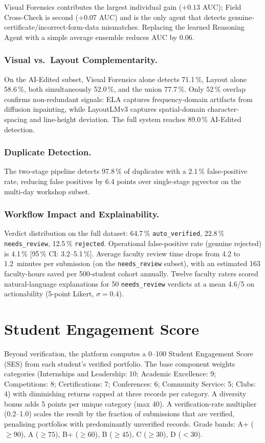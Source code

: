 \documentclass[runningheads]{llncs}
\begin{document}
Visual Forensics contributes the largest individual gain ($+0.13$ AUC); Field Cross-Check is second ($+0.07$ AUC) and is the only agent that detects genuine-certificate/incorrect-form-data mismatches. Replacing the learned Reasoning Agent with a simple average ensemble reduces AUC by 0.06.

\subsubsection{Visual vs.\ Layout Complementarity.} On the AI-Edited subset, Visual Forensics alone detects 71.1\,\%, Layout alone 58.6\,\%, both simultaneously 52.0\,\%, and the union 77.7\,\%. Only 52\,\% overlap confirms non-redundant signals: ELA captures frequency-domain artifacts from diffusion inpainting, while LayoutLMv3 captures spatial-domain character-spacing and line-height deviation. The full system reaches 89.0\,\% AI-Edited detection.

\subsubsection{Duplicate Detection.} The two-stage pipeline detects 97.8\,\% of duplicates with a 2.1\,\% false-positive rate, reducing false positives by 6.4 points over single-stage pgvector on the multi-day workshop subset.

\subsubsection{Workflow Impact and Explainability.} Verdict distribution on the full dataset: 64.7\,\% \texttt{auto\_verified}, 22.8\,\% \texttt{needs\_review}, 12.5\,\% \texttt{rejected}. Operational false-positive rate (genuine rejected) is 4.1\,\% [95\,\% CI: 3.2--5.1\,\%]. Average faculty review time drops from 4.2 to 1.2~minutes per submission (on the \texttt{needs\_review} subset), with an estimated 163 faculty-hours saved per 500-student cohort annually. Twelve faculty raters scored natural-language explanations for 50 \texttt{needs\_review} verdicts at a mean 4.6/5 on actionability (5-point Likert, $\sigma = 0.4$).

\section{Student Engagement Score}
\label{sec:ses}

Beyond verification, the platform computes a 0--100 Student Engagement Score (SES) from each student's verified portfolio. The base component weights categories (Internships and Leadership: 10; Academic Excellence: 9; Competitions: 8; Certifications: 7; Conferences: 6; Community Service: 5; Clubs: 4) with diminishing returns capped at three records per category. A diversity bonus adds 5 points per unique category (max 40). A verification-rate multiplier (0.2--1.0) scales the result by the fraction of submissions that are verified, penalising portfolios with predominantly unverified records. Grade bands: A+ ($\geq 90$), A ($\geq 75$), B+ ($\geq 60$), B ($\geq 45$), C ($\geq 30$), D ($< 30$).
\end{document}
